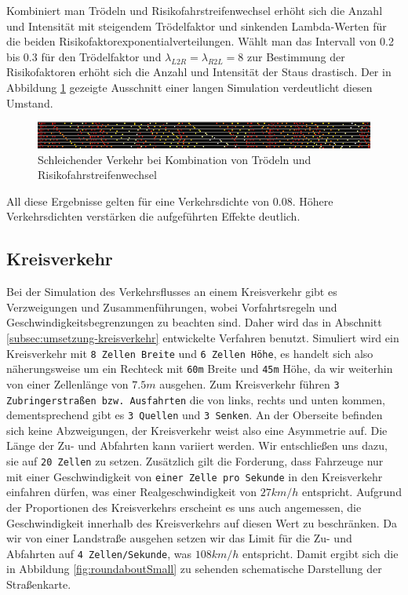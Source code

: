 \documentclass[10pt, a4paper]{article}
\begin{document}
Kombiniert man Trödeln und Risikofahrstreifenwechsel erhöht sich die Anzahl und Intensität mit steigendem Trödelfaktor und sinkenden Lambda-Werten für die beiden Risikofaktorexponentialverteilungen. Wählt man das Intervall von 0.2 bis 0.3 für den Trödelfaktor und $\lambda_{L2R} = \lambda_{R2L} = 8$ zur Bestimmung der Risikofaktoren erhöht sich die Anzahl und Intensität der Staus drastisch. Der in Abbildung \ref{fig:ergMehrspurigTroedelnUndRisikowechsel} gezeigte Ausschnitt einer langen Simulation verdeutlicht diesen Umstand.

\begin{figure}[h!]
	\centering
	\includegraphics[width=\textwidth]{img/erg_mehrspurig_troedeln_und_risikowechsel}
	\caption{Schleichender Verkehr bei Kombination von Trödeln und Risikofahrstreifenwechsel}
	\label{fig:ergMehrspurigTroedelnUndRisikowechsel}
\end{figure}

All diese Ergebnisse gelten für eine Verkehrsdichte von 0.08. Höhere Verkehrsdichten verstärken die aufgeführten Effekte deutlich.


\subsection{Kreisverkehr}
\label{subsec:kreisverkehr}
Bei der Simulation des Verkehrsflusses an einem Kreisverkehr gibt es Verzweigungen und Zusammenführungen, wobei Vorfahrtsregeln und Geschwindigkeitsbegrenzungen zu beachten sind. Daher wird das in Abschnitt \ref{subsec:umsetzung-kreisverkehr} entwickelte Verfahren benutzt. Simuliert wird ein Kreisverkehr mit \texttt{8 Zellen Breite} und \texttt{6 Zellen Höhe}, es handelt sich also näherungsweise um ein Rechteck mit \texttt{60m} Breite und \texttt{45m} Höhe, da wir weiterhin von einer Zellenlänge von $7.5m$ ausgehen. Zum Kreisverkehr führen \texttt{3 Zubringerstraßen bzw. Ausfahrten} die von links, rechts und unten kommen, dementsprechend gibt es \texttt{3 Quellen} und \texttt{3 Senken}. An der Oberseite befinden sich keine Abzweigungen, der Kreisverkehr weist also eine Asymmetrie auf. Die Länge der Zu- und Abfahrten kann variiert werden. Wir entschließen uns dazu, sie auf \texttt{20 Zellen} zu setzen. Zusätzlich gilt die Forderung, dass Fahrzeuge nur mit einer Geschwindigkeit von \texttt{einer Zelle pro Sekunde} in den Kreisverkehr einfahren dürfen, was einer Realgeschwindigkeit von $27km/h$ entspricht. Aufgrund der Proportionen des Kreisverkehrs erscheint es uns auch angemessen, die Geschwindigkeit innerhalb des Kreisverkehrs auf diesen Wert zu beschränken. Da wir von einer Landstraße ausgehen setzen wir das Limit für die Zu- und Abfahrten auf \texttt{4 Zellen/Sekunde}, was $108km/h$ entspricht. Damit ergibt sich die in Abbildung \ref{fig:roundaboutSmall} zu sehenden schematische Darstellung der Straßenkarte.
\end{document}
